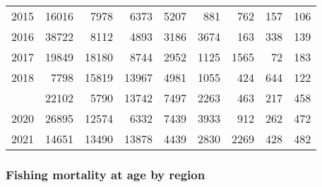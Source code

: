 \documentclass[
]{article}
\begin{document}
\begin{longtable}[t]{lrrrrrrrr}
2015 & 16016 & 7978 & 6373 & 5207 & 881 & 762 & 157 & 106\\
2016 & 38722 & 8112 & 4893 & 3186 & 3674 & 163 & 338 & 139\\
2017 & 19849 & 18180 & 8744 & 2952 & 1125 & 1565 & 72 & 183\\
2018 & 7798 & 15819 & 13967 & 4981 & 1055 & 424 & 644 & 122\\
\addlinespace
2019 & 22102 & 5790 & 13742 & 7497 & 2263 & 463 & 217 & 458\\
2020 & 26895 & 12574 & 6332 & 7439 & 3933 & 912 & 262 & 472\\
2021 & 14651 & 13490 & 13878 & 4439 & 2830 & 2269 & 428 & 482\\*
\end{longtable}

\hypertarget{fishing-mortality-at-age-by-region}{%
\subsubsection{Fishing mortality at age by
region}\label{fishing-mortality-at-age-by-region}}
\end{document}
